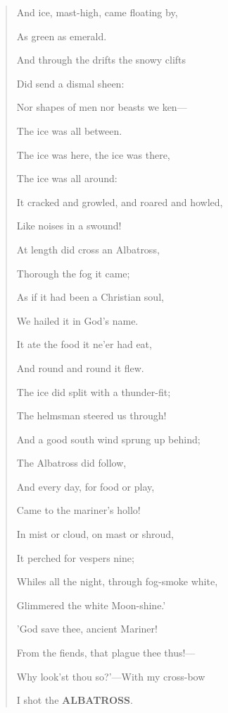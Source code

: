\documentclass[12pt]{book}
\begin{document}
\begin{verse}
And ice, mast-high, came floating by,

As green as emerald.

\bigskip
\bigskip

And through the drifts the snowy clifts

Did send a dismal sheen:

Nor shapes of men nor beasts we ken—

The ice was all between.

\bigskip
\bigskip

The ice was here, the ice was there,

The ice was all around:

\medskip

It cracked and growled, and roared and howled,

Like noises in a swound!

\bigskip
\bigskip
\bigskip

At length did cross an Albatross,

Thorough the fog it came;

As if it had been a Christian soul,

We hailed it in God's name.

\clearpage

It ate the food it ne'er had eat,

And round and round it flew.

The ice did split with a thunder-fit;

The helmsman steered us through!

\bigskip

And a good south wind sprung up behind;

The Albatross did follow,

And every day, for food or play,

Came to the mariner's hollo!

\bigskip

In mist or cloud, on mast or shroud,

It perched for vespers nine;

Whiles all the night, through fog-smoke white,

Glimmered the white Moon-shine.'

\bigskip
\bigskip
\bigskip

'God save thee, ancient Mariner!

From the fiends, that plague thee thus!—

\medskip

Why look'st thou so?'—With my cross-bow

I shot the \textbf{ALBATROSS}.

\end{verse}
\end{document}
